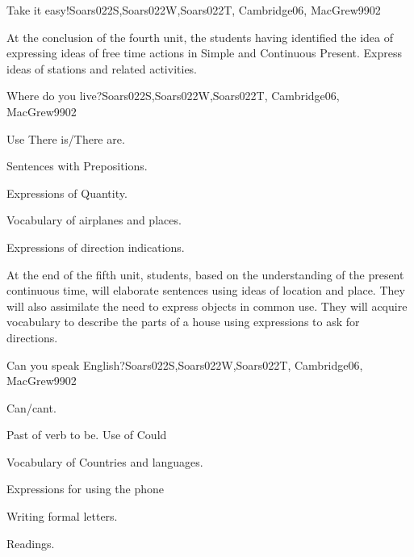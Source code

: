 \begin{syllabus}
\begin{unit}{}{Take it easy!}{Soars022S,Soars022W,Soars022T, Cambridge06, MacGrew99}{0}{2}
   \begin{learningoutcomes}
      \item At the conclusion of the fourth unit, the students having identified the idea of expressing ideas of free time actions in Simple and Continuous Present. Express ideas of stations and related activities.
   \end{learningoutcomes}

\end{unit}

\begin{unit}{}{Where do you live?}{Soars022S,Soars022W,Soars022T, Cambridge06, MacGrew99}{0}{2}
   \begin{topics}
      \item Use There is/There are.
      \item Sentences with Prepositions.
      \item Expressions of Quantity.
      \item Vocabulary of airplanes and places.
      \item Expressions of direction indications.
   \end{topics}

   \begin{learningoutcomes}
      \item At the end of the fifth unit, students, based on the understanding of the present continuous time, will elaborate sentences using ideas of location and place. They will also assimilate the need to express objects in common use. They will acquire vocabulary to describe the parts of a house using expressions to ask for directions.
   \end{learningoutcomes}

\end{unit}

\begin{unit}{}{Can you speak English?}{Soars022S,Soars022W,Soars022T, Cambridge06, MacGrew99}{0}{2}
   \begin{topics}
      \item Can/cant.
      \item Past of verb to be. Use of Could
      \item Vocabulary of Countries and languages.
      \item Expressions for using the phone
      \item Writing formal letters.
      \item Readings.
   \end{topics}


\end{unit}
\end{syllabus}
